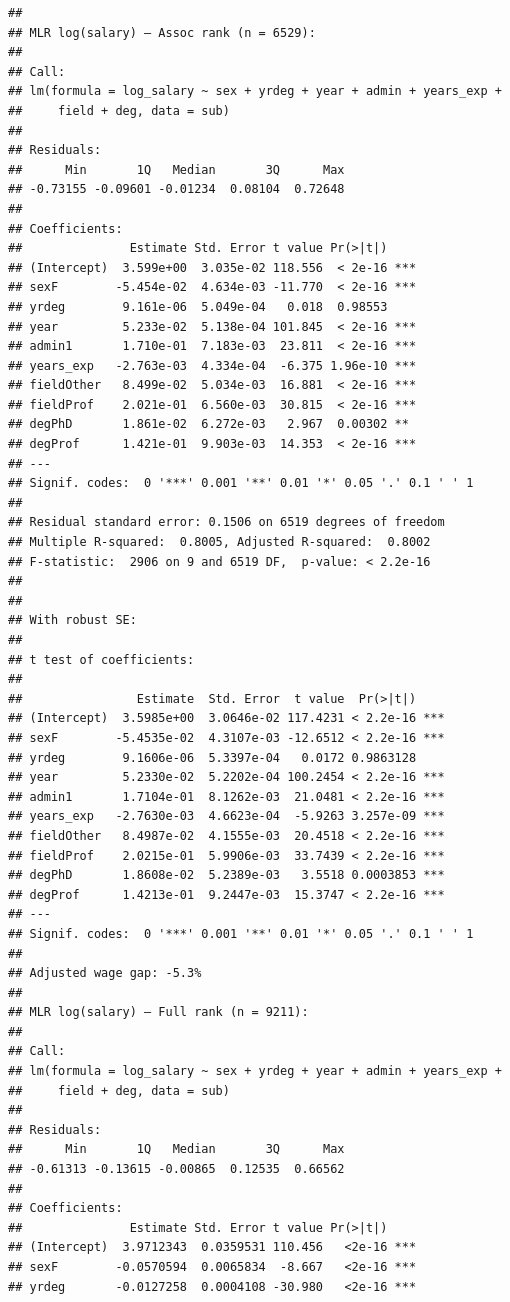 \documentclass[
]{article}
\begin{document}
\begin{verbatim}
## 
## MLR log(salary) — Assoc rank (n = 6529):
## 
## Call:
## lm(formula = log_salary ~ sex + yrdeg + year + admin + years_exp + 
##     field + deg, data = sub)
## 
## Residuals:
##      Min       1Q   Median       3Q      Max 
## -0.73155 -0.09601 -0.01234  0.08104  0.72648 
## 
## Coefficients:
##               Estimate Std. Error t value Pr(>|t|)    
## (Intercept)  3.599e+00  3.035e-02 118.556  < 2e-16 ***
## sexF        -5.454e-02  4.634e-03 -11.770  < 2e-16 ***
## yrdeg        9.161e-06  5.049e-04   0.018  0.98553    
## year         5.233e-02  5.138e-04 101.845  < 2e-16 ***
## admin1       1.710e-01  7.183e-03  23.811  < 2e-16 ***
## years_exp   -2.763e-03  4.334e-04  -6.375 1.96e-10 ***
## fieldOther   8.499e-02  5.034e-03  16.881  < 2e-16 ***
## fieldProf    2.021e-01  6.560e-03  30.815  < 2e-16 ***
## degPhD       1.861e-02  6.272e-03   2.967  0.00302 ** 
## degProf      1.421e-01  9.903e-03  14.353  < 2e-16 ***
## ---
## Signif. codes:  0 '***' 0.001 '**' 0.01 '*' 0.05 '.' 0.1 ' ' 1
## 
## Residual standard error: 0.1506 on 6519 degrees of freedom
## Multiple R-squared:  0.8005, Adjusted R-squared:  0.8002 
## F-statistic:  2906 on 9 and 6519 DF,  p-value: < 2.2e-16
## 
## 
## With robust SE:
## 
## t test of coefficients:
## 
##                Estimate  Std. Error  t value  Pr(>|t|)    
## (Intercept)  3.5985e+00  3.0646e-02 117.4231 < 2.2e-16 ***
## sexF        -5.4535e-02  4.3107e-03 -12.6512 < 2.2e-16 ***
## yrdeg        9.1606e-06  5.3397e-04   0.0172 0.9863128    
## year         5.2330e-02  5.2202e-04 100.2454 < 2.2e-16 ***
## admin1       1.7104e-01  8.1262e-03  21.0481 < 2.2e-16 ***
## years_exp   -2.7630e-03  4.6623e-04  -5.9263 3.257e-09 ***
## fieldOther   8.4987e-02  4.1555e-03  20.4518 < 2.2e-16 ***
## fieldProf    2.0215e-01  5.9906e-03  33.7439 < 2.2e-16 ***
## degPhD       1.8608e-02  5.2389e-03   3.5518 0.0003853 ***
## degProf      1.4213e-01  9.2447e-03  15.3747 < 2.2e-16 ***
## ---
## Signif. codes:  0 '***' 0.001 '**' 0.01 '*' 0.05 '.' 0.1 ' ' 1
## 
## Adjusted wage gap: -5.3%
## 
## MLR log(salary) — Full rank (n = 9211):
## 
## Call:
## lm(formula = log_salary ~ sex + yrdeg + year + admin + years_exp + 
##     field + deg, data = sub)
## 
## Residuals:
##      Min       1Q   Median       3Q      Max 
## -0.61313 -0.13615 -0.00865  0.12535  0.66562 
## 
## Coefficients:
##               Estimate Std. Error t value Pr(>|t|)    
## (Intercept)  3.9712343  0.0359531 110.456   <2e-16 ***
## sexF        -0.0570594  0.0065834  -8.667   <2e-16 ***
## yrdeg       -0.0127258  0.0004108 -30.980   <2e-16 ***

\end{verbatim}
\end{document}
